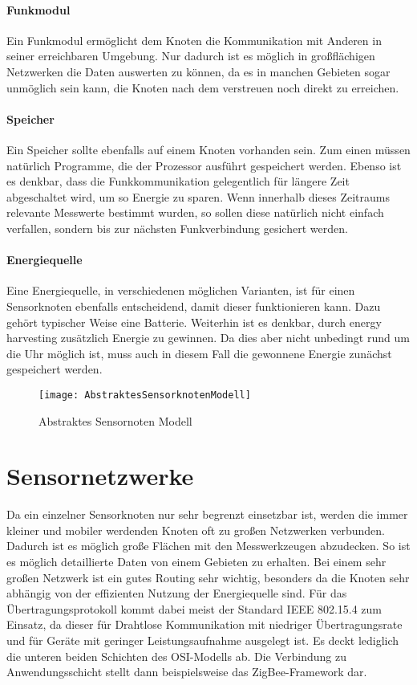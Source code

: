 \paragraph{Funkmodul} Ein Funkmodul ermöglicht dem Knoten die Kommunikation mit Anderen in seiner erreichbaren Umgebung. Nur dadurch ist es möglich in großflächigen Netzwerken die Daten auswerten zu können, da es in manchen Gebieten sogar unmöglich sein kann, die Knoten nach dem verstreuen noch direkt zu erreichen.
\paragraph{Speicher} Ein Speicher sollte ebenfalls auf einem Knoten vorhanden sein. Zum einen müssen natürlich Programme, die der Prozessor ausführt gespeichert werden. Ebenso ist es denkbar, dass die Funkkommunikation gelegentlich für längere Zeit abgeschaltet wird, um so Energie zu sparen. Wenn innerhalb dieses Zeitraums relevante Messwerte bestimmt wurden, so sollen diese natürlich nicht einfach verfallen, sondern bis zur nächsten Funkverbindung gesichert werden.
\paragraph{Energiequelle} Eine Energiequelle, in verschiedenen möglichen Varianten, ist für einen Sensorknoten ebenfalls entscheidend, damit dieser funktionieren kann. Dazu gehört typischer Weise eine Batterie. Weiterhin ist es denkbar, durch energy harvesting zusätzlich Energie zu gewinnen. Da dies aber nicht unbedingt rund um die Uhr möglich ist, muss auch in diesem Fall die gewonnene Energie zunächst gespeichert werden.

\begin{figure}[htbp]
\centering
\caption{Abstraktes Sensornoten Modell}
\label{fig:sensornode}
\texttt{[image: AbstraktesSensorknotenModell]}
\end{figure}

\section{Sensornetzwerke}

Da ein einzelner Sensorknoten nur sehr begrenzt einsetzbar ist, werden die immer kleiner und mobiler werdenden Knoten oft zu großen Netzwerken verbunden. Dadurch ist es möglich große Flächen mit den Messwerkzeugen abzudecken. So ist es möglich detaillierte Daten von einem Gebieten zu erhalten.\newline
Bei einem sehr großen Netzwerk ist ein gutes Routing sehr wichtig, besonders da die Knoten sehr abhängig von der effizienten Nutzung der Energiequelle sind. Für das Übertragungsprotokoll kommt dabei meist der Standard IEEE 802.15.4 zum Einsatz, da dieser für Drahtlose Kommunikation mit niedriger Übertragungsrate und für Geräte mit geringer Leistungsaufnahme ausgelegt ist. Es deckt lediglich die unteren beiden Schichten des OSI-Modells ab.\newline
Die Verbindung zu Anwendungsschicht stellt dann beispielsweise das ZigBee-Framework dar. \\
